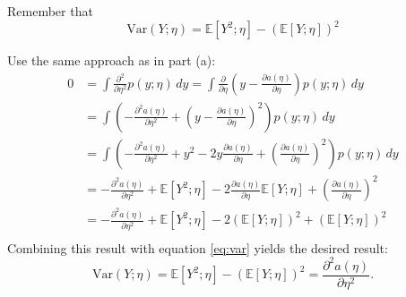 \begin{answer}
Remember that
\begin{equation}
    \label{eq:var}
    \mathrm{Var}(Y;\eta) = \mathbb{E}[Y^2;\eta] - (\mathbb{E}[Y;\eta])^2
\end{equation}

Use the same approach as in part (a):
\begin{align*} 0 &= \int \frac{\partial^2}{\partial \eta^2} p(y;\eta) \,dy  = \int \frac{\partial}{\partial \eta} \left(y-\frac{\partial a(\eta)}{\partial\eta}\right)p(y;\eta) \,dy \\
    &= \int \left( -\frac{\partial^2 a(\eta)}{\partial \eta^2} + \left(y-\frac{\partial a(\eta)}{\partial\eta}\right)^2 \right) p(y;\eta) \,dy \\
    &= \int \left( -\frac{\partial^2 a(\eta)}{\partial \eta^2} + y^2 - 2 y \frac{\partial a(\eta)}{\partial\eta} + \left(\frac{\partial a(\eta)}{\partial\eta}\right)^2 \right) p(y;\eta) \,dy \\
    &= -\frac{\partial^2 a(\eta)}{\partial \eta^2} +  \mathbb{E}[Y^2;\eta] - 2\frac{\partial a(\eta)}{\partial\eta} \mathbb{E}[Y;\eta] + \left(\frac{\partial a(\eta)}{\partial\eta}\right)^2 \\
    &= -\frac{\partial^2 a(\eta)}{\partial \eta^2} +  \mathbb{E}[Y^2;\eta] - 2 (\mathbb{E}[Y;\eta])^2 + \left(\mathbb{E}[Y;\eta]\right)^2 \\
\end{align*}
Combining this result with equation \ref{eq:var} yields the desired result:
\begin{equation*}
    \mathrm{Var}(Y;\eta) = \mathbb{E}[Y^2;\eta] - (\mathbb{E}[Y;\eta])^2 = \frac{\partial^2 a(\eta)}{\partial \eta^2}.
\end{equation*}
\end{answer}
